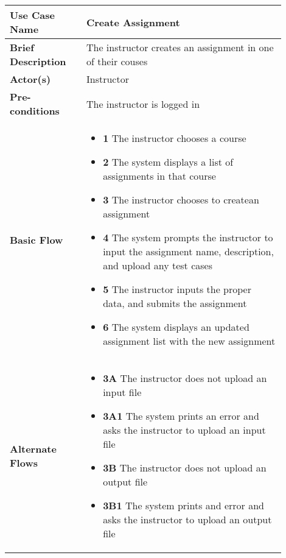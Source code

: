 \documentclass{article}
\begin{document}
\begin{tabular}{| p{0.25\linewidth} | p{0.65\linewidth} |}
  \hline
  \textbf{Use Case Name} & Create Assignment \\
  \hline
  \textbf{Brief Description} & The instructor creates an assignment in one of their couses \\
  \hline
  \textbf{Actor(s)} & Instructor \\
  \hline
  \textbf{Pre-conditions} & The instructor is logged in\\
  \hline
  \textbf{Basic Flow} & \begin{itemize}
    \item[] \textbf{1} The instructor chooses a course
    \item[] \textbf{2} The system displays a list of assignments in that course
    \item[] \textbf{3} The instructor chooses to createan assignment
    \item[] \textbf{4} The system prompts the instructor to input the assignment name, description, and upload any test cases
    \item[] \textbf{5} The instructor inputs the proper data, and submits the assignment
    \item[] \textbf{6} The system displays an updated assignment list with the new assignment
  \end{itemize}\\
  \hline
  \textbf{Alternate Flows} & \begin{itemize}
    \item[] \textbf{3A} The instructor does not upload an input file
    \item[] \textbf{3A1} The system prints an error and asks the instructor to upload an input file
    \item[] \textbf{3B} The instructor does not upload an output file
    \item[] \textbf{3B1} The system prints and error and asks the instructor to upload an output file
  \end{itemize} \\
  \hline
\end{tabular}

\vspace{0.2in}
\end{document}
